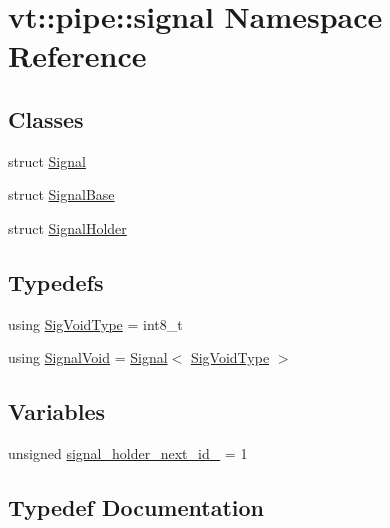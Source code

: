 \hypertarget{namespacevt_1_1pipe_1_1signal}{}\section{vt\+:\+:pipe\+:\+:signal Namespace Reference}
\label{namespacevt_1_1pipe_1_1signal}
\subsection*{Classes}
\begin{DoxyCompactItemize}
\item 
struct \hyperlink{structvt_1_1pipe_1_1signal_1_1_signal}{Signal}
\item 
struct \hyperlink{structvt_1_1pipe_1_1signal_1_1_signal_base}{Signal\+Base}
\item 
struct \hyperlink{structvt_1_1pipe_1_1signal_1_1_signal_holder}{Signal\+Holder}
\end{DoxyCompactItemize}
\subsection*{Typedefs}
\begin{DoxyCompactItemize}
\item 
using \hyperlink{namespacevt_1_1pipe_1_1signal_acbe257d1ae44f20fa9fd9b6ed3057caf}{Sig\+Void\+Type} = int8\+\_\+t
\item 
using \hyperlink{namespacevt_1_1pipe_1_1signal_ac80a6a95b9545fa65856842a88ac6087}{Signal\+Void} = \hyperlink{structvt_1_1pipe_1_1signal_1_1_signal}{Signal}$<$ \hyperlink{namespacevt_1_1pipe_1_1signal_acbe257d1ae44f20fa9fd9b6ed3057caf}{Sig\+Void\+Type} $>$
\end{DoxyCompactItemize}
\subsection*{Variables}
\begin{DoxyCompactItemize}
\item 
unsigned \hyperlink{namespacevt_1_1pipe_1_1signal_a31dc3a8ec5ea21eb349481eb1ca833e7}{signal\+\_\+holder\+\_\+next\+\_\+id\+\_\+} = 1
\end{DoxyCompactItemize}


\subsection{Typedef Documentation}
\mbox{\label{namespacevt_1_1pipe_1_1signal_ac80a6a95b9545fa65856842a88ac6087}} 
